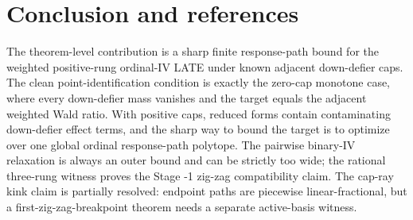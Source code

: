 \documentclass[11pt]{article}
\theoremstyle{definition}
\theoremstyle{plain}
\theoremstyle{remark}
\begin{document}
\section{Conclusion and references}
The theorem-level contribution is a sharp finite response-path bound for the
weighted positive-rung ordinal-IV LATE under known adjacent down-defier caps.
The clean point-identification condition is exactly the zero-cap monotone
case, where every down-defier mass vanishes and the target equals the adjacent
weighted Wald ratio.  With positive caps, reduced forms contain contaminating
down-defier effect terms, and the sharp way to bound the target is to optimize
over one global ordinal response-path polytope.  The pairwise binary-IV
relaxation is always an outer bound and can be strictly too wide; the rational
three-rung witness proves the Stage -1 zig-zag compatibility claim.  The cap-ray
kink claim is partially resolved: endpoint paths are piecewise
linear-fractional, but a first-zig-zag-breakpoint theorem needs a separate
active-basis witness.
\end{document}
